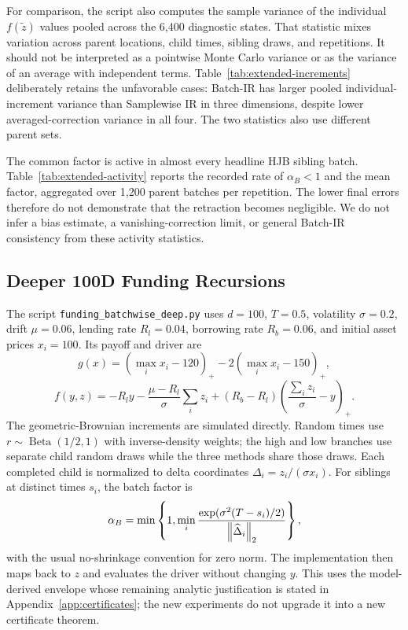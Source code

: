 

For comparison, the script also computes the sample variance of the individual $f(\widetilde z)$ values pooled across the 6,400 diagnostic states. That statistic mixes variation across parent locations, child times, sibling draws, and repetitions. It should not be interpreted as a pointwise Monte Carlo variance or as the variance of an average with independent terms. Table~\ref{tab:extended-increments} deliberately retains the unfavorable cases: Batch-IR has larger pooled individual-increment variance than Samplewise IR in three dimensions, despite lower averaged-correction variance in all four. The two statistics also use different parent sets.



The common factor is active in almost every headline HJB sibling batch. Table~\ref{tab:extended-activity} reports the recorded rate of $\alpha_B<1$ and the mean factor, aggregated over 1,200 parent batches per repetition. The lower final errors therefore do not demonstrate that the retraction becomes negligible. We do not infer a bias estimate, a vanishing-correction limit, or general Batch-IR consistency from these activity statistics.


\FloatBarrier

\subsection{Deeper 100D Funding Recursions}
\label{app:extended-funding}
The script \texttt{funding\_batchwise\_deep.py} uses $d=100$, $T=0.5$, volatility $\sigma=0.2$, drift $\mu=0.06$, lending rate $R_l=0.04$, borrowing rate $R_b=0.06$, and initial asset prices $x_i=100$. Its payoff and driver are
\[
 g(x)=(\max_i x_i-120)_+-2(\max_i x_i-150)_+,
\]
\[
 f(y,z)=-R_l y-\frac{\mu-R_l}{\sigma}\sum_i z_i
 +(R_b-R_l)\left(\frac{\sum_i z_i}{\sigma}-y\right)_+.
\]
The geometric-Brownian increments are simulated directly. Random times use $r\sim\operatorname{Beta}(1/2,1)$ with inverse-density weights; the high and low branches use separate child random draws while the three methods share those draws. Each completed child is normalized to delta coordinates $\Delta_i=z_i/(\sigma x_i)$. For siblings at distinct times $s_i$, the batch factor is
\[
 \alpha_B=\min\left\{1,\min_i
 \frac{\exp(\sigma^2(T-s_i)/2)}{\left\lVert \widehat\Delta_i\right\rVert_2}\right\},
\]
with the usual no-shrinkage convention for zero norm. The implementation then maps back to $z$ and evaluates the driver without changing $y$. This uses the model-derived envelope whose remaining analytic justification is stated in Appendix~\ref{app:certificates}; the new experiments do not upgrade it into a new certificate theorem.

